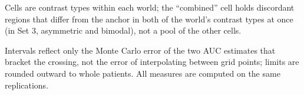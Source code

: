 \documentclass[AMA,Times1COL]{WileyNJDv5}
\begin{document}
\begin{table}[ht]
\centering
\caption{Per-region sample size at which selection AUC reaches 0.9, by cell and measure, interpolated on $\log n$ over the grid $n = 25$--2{,}000, with 95\% Monte Carlo intervals from the delta method applied to the log-$n$ interpolation. Cells whose AUC stays at chance (--) across the full grid are marked ``blind''; $\leq 25$ marks a target reached at the smallest grid size, where no interval is available.\label{tab:study2_required_n_mc}}%
\begin{tablenotes}
\item Cells are contrast types within each world; the ``combined'' cell holds discordant regions that differ from the anchor in both of the world's contrast types at once (in Set 3, asymmetric and bimodal), not a pool of the other cells.
\item Intervals reflect only the Monte Carlo error of the two AUC estimates that bracket the crossing, not the error of interpolating between grid points; limits are rounded outward to whole patients. All measures are computed on the same replications.
\end{tablenotes}
\end{table}
\end{document}
